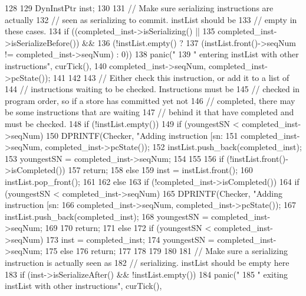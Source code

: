 \begin{DoxyCode}
128 {
129     DynInstPtr inst;
130 
131     // Make sure serializing instructions are actually
132     // seen as serializing to commit. instList should be
133     // empty in these cases.
134     if ((completed_inst->isSerializing() ||
135         completed_inst->isSerializeBefore()) &&
136         (!instList.empty() ?
137          (instList.front()->seqNum != completed_inst->seqNum) : 0)) {
138         panic("%
139               " entering instList with other instructions\n", curTick(),
140               completed_inst->seqNum, completed_inst->pcState());
141     }
142 
143     // Either check this instruction, or add it to a list of
144     // instructions waiting to be checked.  Instructions must be
145     // checked in program order, so if a store has committed yet not
146     // completed, there may be some instructions that are waiting
147     // behind it that have completed and must be checked.
148     if (!instList.empty()) {
149         if (youngestSN < completed_inst->seqNum) {
150             DPRINTF(Checker, "Adding instruction [sn:%
151                     completed_inst->seqNum, completed_inst->pcState());
152             instList.push_back(completed_inst);
153             youngestSN = completed_inst->seqNum;
154         }
155 
156         if (!instList.front()->isCompleted()) {
157             return;
158         } else {
159             inst = instList.front();
160             instList.pop_front();
161         }
162     } else {
163         if (!completed_inst->isCompleted()) {
164             if (youngestSN < completed_inst->seqNum) {
165                 DPRINTF(Checker, "Adding instruction [sn:%
166                         completed_inst->seqNum, completed_inst->pcState());
167                 instList.push_back(completed_inst);
168                 youngestSN = completed_inst->seqNum;
169             }
170             return;
171         } else {
172             if (youngestSN < completed_inst->seqNum) {
173                 inst = completed_inst;
174                 youngestSN = completed_inst->seqNum;
175             } else {
176                 return;
177             }
178         }
179     }
180 
181     // Make sure a serializing instruction is actually seen as
182     // serializing. instList should be empty here
183     if (inst->isSerializeAfter() && !instList.empty()) {
184         panic("%
185              " exiting instList with other instructions\n", curTick(),
}}
\end{DoxyCode}
